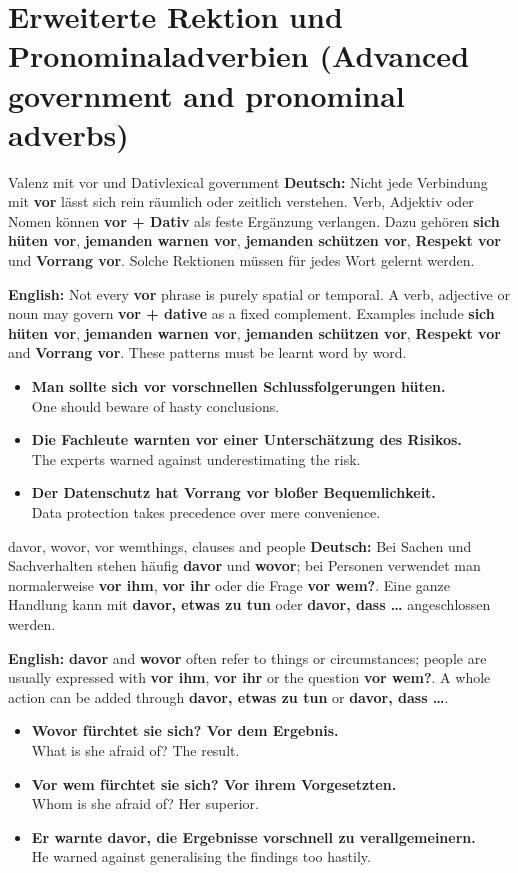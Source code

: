 \documentclass[a4paper,11pt]{article}
\newcommand{\GermanText}[1]{\textbf{Deutsch: }#1\par}
\newcommand{\EnglishText}[1]{{\small\color{SoftGray}\textbf{English: }#1\par}}
\newcommand{\ExampleItem}[2]{\item \textbf{#1}\\{\small\color{SoftGray}#2}}
\begin{document}
    \section{Erweiterte Rektion und Pronominaladverbien (Advanced government and pronominal adverbs)}
        \begin{grammarentry}{Valenz mit vor und Dativ}{lexical government}
            \GermanText{Nicht jede Verbindung mit \textbf{vor} lässt sich rein räumlich oder zeitlich verstehen. Verb, Adjektiv oder Nomen können \textbf{vor + Dativ} als feste Ergänzung verlangen. Dazu gehören \textbf{sich hüten vor}, \textbf{jemanden warnen vor}, \textbf{jemanden schützen vor}, \textbf{Respekt vor} und \textbf{Vorrang vor}. Solche Rektionen müssen für jedes Wort gelernt werden.}
            \EnglishText{Not every \textbf{vor} phrase is purely spatial or temporal. A verb, adjective or noun may govern \textbf{vor + dative} as a fixed complement. Examples include \textbf{sich hüten vor}, \textbf{jemanden warnen vor}, \textbf{jemanden schützen vor}, \textbf{Respekt vor} and \textbf{Vorrang vor}. These patterns must be learnt word by word.}
        \end{grammarentry}
        \begin{exbox}
            \begin{itemize}
                \ExampleItem{Man sollte sich vor vorschnellen Schlussfolgerungen hüten.}{One should beware of hasty conclusions.}
                \ExampleItem{Die Fachleute warnten vor einer Unterschätzung des Risikos.}{The experts warned against underestimating the risk.}
                \ExampleItem{Der Datenschutz hat Vorrang vor bloßer Bequemlichkeit.}{Data protection takes precedence over mere convenience.}
            \end{itemize}
        \end{exbox}
        \begin{grammarentry}{davor, wovor, vor wem}{things, clauses and people}
            \GermanText{Bei Sachen und Sachverhalten stehen häufig \textbf{davor} und \textbf{wovor}; bei Personen verwendet man normalerweise \textbf{vor ihm}, \textbf{vor ihr} oder die Frage \textbf{vor wem?}. Eine ganze Handlung kann mit \textbf{davor, etwas zu tun} oder \textbf{davor, dass \ldots{}} angeschlossen werden.}
            \EnglishText{\textbf{davor} and \textbf{wovor} often refer to things or circumstances; people are usually expressed with \textbf{vor ihm}, \textbf{vor ihr} or the question \textbf{vor wem?}. A whole action can be added through \textbf{davor, etwas zu tun} or \textbf{davor, dass \ldots{}}.}
        \end{grammarentry}
        \begin{exbox}
            \begin{itemize}
                \ExampleItem{Wovor fürchtet sie sich? Vor dem Ergebnis.}{What is she afraid of? The result.}
                \ExampleItem{Vor wem fürchtet sie sich? Vor ihrem Vorgesetzten.}{Whom is she afraid of? Her superior.}
                \ExampleItem{Er warnte davor, die Ergebnisse vorschnell zu verallgemeinern.}{He warned against generalising the findings too hastily.}
            \end{itemize}
        \end{exbox}
\end{document}
